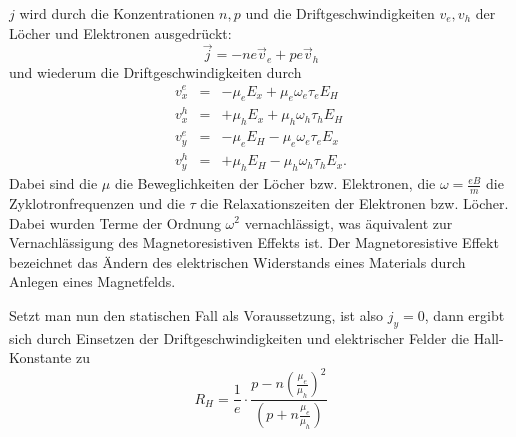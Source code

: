 $j$ wird durch die Konzentrationen $n,p$ und die Driftgeschwindigkeiten $v_e, v_h$ der Löcher und Elektronen ausgedrückt:
\begin{equation}
 \vec j=-ne\vec v_e+pe\vec v_h
\end{equation}
und wiederum die Driftgeschwindigkeiten durch 
\begin{eqnarray}
 v_x^e &=& -\mu_eE_x+\mu_e\omega_e\tau_eE_H\\
 v_x^h &=& +\mu_hE_x+\mu_h\omega_h\tau_hE_H\\
 v_y^e &=& -\mu_eE_H-\mu_e\omega_e\tau_eE_x\\
 v_y^h &=& +\mu_hE_H-\mu_h\omega_h\tau_hE_x.
\end{eqnarray}
Dabei sind die $\mu$ die Beweglichkeiten der Löcher bzw. Elektronen, die $\omega=\frac{eB}{m}$ die Zyklotronfrequenzen und die $\tau$ die Relaxationszeiten der Elektronen bzw. Löcher. Dabei  wurden Terme der Ordnung $\omega^2$ vernachlässigt, was äquivalent zur Vernachlässigung des Magnetoresistiven Effekts ist. Der Magnetoresistive Effekt bezeichnet das Ändern des elektrischen Widerstands eines Materials durch Anlegen eines Magnetfelds.

Setzt man nun den statischen Fall als Voraussetzung, ist also $j_y=0$, dann ergibt sich durch Einsetzen der Driftgeschwindigkeiten und elektrischer Felder die Hall-Konstante zu
\begin{equation}
 R_H = \frac{1}{e}\cdot\frac{p-n\left(\frac{\mu_e}{\mu_h}\right)^2}{\left(p+n\frac{\mu_e}{\mu_h}\right)}
\end{equation}
